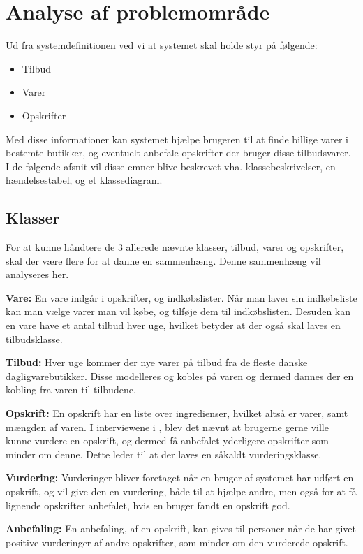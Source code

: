 \section{Analyse af problemområde}

Ud fra systemdefinitionen ved vi at systemet skal holde styr på følgende:

\begin{itemize}
	\item Tilbud
	\item Varer
	\item Opskrifter
\end{itemize}

Med disse informationer kan systemet hjælpe brugeren til at finde billige varer i bestemte butikker, og eventuelt anbefale opskrifter der bruger disse tilbudsvarer.
I de følgende afsnit vil disse emner blive beskrevet vha. klassebeskrivelser, en hændelsestabel, og et klassediagram.

\subsection{Klasser}
For at kunne håndtere de 3 allerede nævnte klasser, tilbud, varer og opskrifter, skal der være flere for at danne en sammenhæng.
Denne sammenhæng vil analyseres her.

\textbf{Vare:}
En vare indgår i opskrifter, og indkøbslister.
Når man laver sin indkøbsliste kan man vælge varer man vil købe, og tilføje dem til indkøbslisten.
Desuden kan en vare have et antal tilbud hver uge, hvilket betyder at der også skal laves en tilbudsklasse.

\textbf{Tilbud:}
Hver uge kommer der nye varer på tilbud fra de fleste danske dagligvarebutikker.
Disse modelleres og kobles på varen og dermed dannes der en kobling fra varen til tilbudene.

\textbf{Opskrift:}
En opskrift har en liste over ingredienser, hvilket altså er varer, samt mængden af varen.
I interviewene i , blev det nævnt at brugerne gerne ville kunne vurdere en opskrift, og dermed få anbefalet yderligere opskrifter som minder om denne.
Dette leder til at der laves en såkaldt vurderingsklasse.

\textbf{Vurdering:}
Vurderinger bliver foretaget når en bruger af systemet har udført en opskrift, og vil give den en vurdering, både til at hjælpe andre, men også for at få lignende opskrifter anbefalet, hvis en bruger fandt en opskrift god.

\textbf{Anbefaling:}
En anbefaling, af en opskrift, kan gives til personer når de har givet positive vurderinger af andre opskrifter, som minder om den vurderede opskrift.

